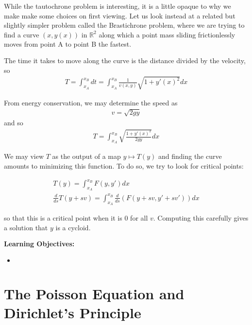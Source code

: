 \documentclass{article}
\newcommand{\R}{{\mathbb{R}}}
\begin{document}
	
	
	
	
	
	
	
	While the tautochrone problem is interesting, it is a little opaque to why we make make some choices on first viewing. Let us look instead at a related but slightly simpler problem called the Brastichrone problem, where we are trying to find a curve $(x, y(x))$ in $\R^{2}$ along which a point mass sliding frictionlessly moves from point A to point B the fastest. 
	
	The time it takes to move along the curve is the distance divided by the velocity, so 
	\begin{align*}
		T = \int_{x_{A}}^{x_{B}} dt = \int_{x_A}^{x_B} \frac{1}{v(x,y)}\sqrt{1 + y'(x)^{2}} dx
	\end{align*}
	
	From energy conservation, we may determine the speed as 
	\begin{align*}
		v = \sqrt{2gy}
	\end{align*}
	and so 
	\begin{align*}
		T = \int_{x_{A}}^{x_{B}} \sqrt{\frac{1 + y'(x)^{2}}{2gy}} dx 
	\end{align*}
	
	We may view $T$ as the output of a map $y \mapsto T(y)$ and finding the curve amounts to minimizing this function. To do so, we try to look for critical points:
	
	\begin{align*}
		T(y) =  \int_{x_{A}}^{x_{B}} F(y,y') dx  \\
		\frac{d}{ds}T(y+sv) = \int_{x_A}^{x_B} \frac{d}{ds} \left( F(y+sv,y'+sv')\right)dx
	\end{align*}
	
	so that this is a critical point when it is 0 for all $v$. Computing this carefully gives a solution that $y$ is a cycloid. 
	
	
	
	
	
	
	\vspace{1cm}
	\textbf{Learning Objectives:}
	\begin{itemize}
		\item 
	\end{itemize}
	
	
	
	
	
	\section{The Poisson Equation and Dirichlet's Principle}
	
\end{document}

